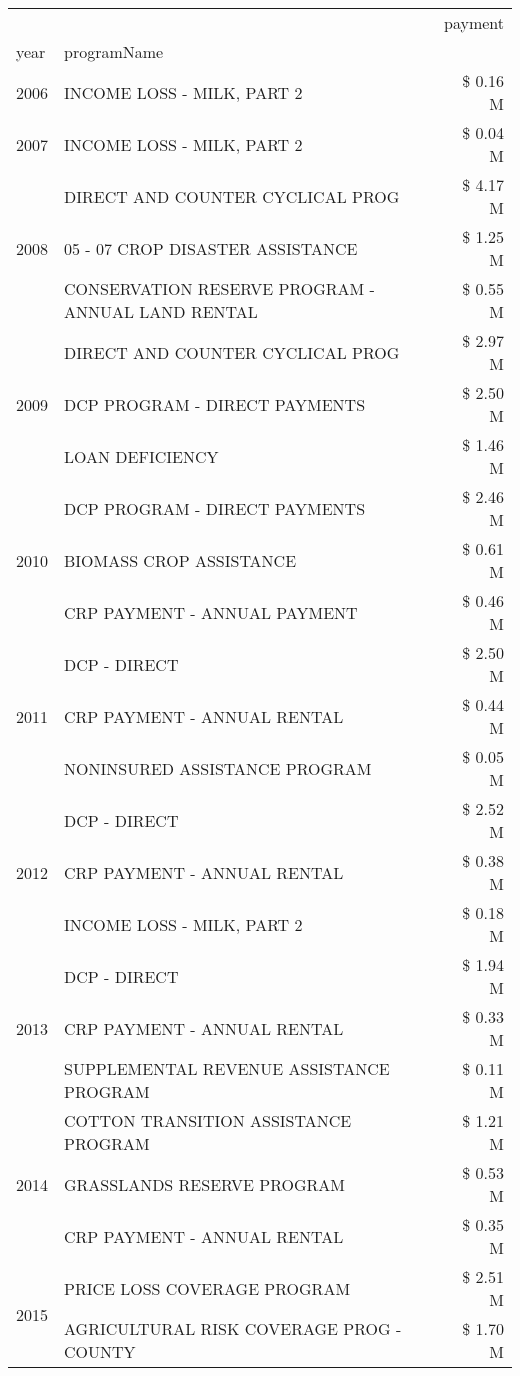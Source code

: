 \begin{tabular}{llr}
\toprule
 &  & payment \\
year & programName &  \\
\midrule
2006 & INCOME LOSS - MILK, PART 2 & \$ 0.16 M \\
\cline{1-3}
2007 & INCOME LOSS - MILK, PART 2 & \$ 0.04 M \\
\cline{1-3}
\multirow[t]{3}{*}{2008} & DIRECT AND COUNTER CYCLICAL PROG & \$ 4.17 M \\
 & 05 - 07 CROP DISASTER ASSISTANCE & \$ 1.25 M \\
 & CONSERVATION RESERVE PROGRAM - ANNUAL LAND RENTAL & \$ 0.55 M \\
\cline{1-3}
\multirow[t]{3}{*}{2009} & DIRECT AND COUNTER CYCLICAL PROG & \$ 2.97 M \\
 & DCP PROGRAM - DIRECT PAYMENTS & \$ 2.50 M \\
 & LOAN DEFICIENCY & \$ 1.46 M \\
\cline{1-3}
\multirow[t]{3}{*}{2010} & DCP PROGRAM - DIRECT PAYMENTS & \$ 2.46 M \\
 & BIOMASS CROP ASSISTANCE & \$ 0.61 M \\
 & CRP PAYMENT - ANNUAL PAYMENT & \$ 0.46 M \\
\cline{1-3}
\multirow[t]{3}{*}{2011} & DCP - DIRECT & \$ 2.50 M \\
 & CRP PAYMENT - ANNUAL RENTAL & \$ 0.44 M \\
 & NONINSURED ASSISTANCE PROGRAM & \$ 0.05 M \\
\cline{1-3}
\multirow[t]{3}{*}{2012} & DCP - DIRECT & \$ 2.52 M \\
 & CRP PAYMENT - ANNUAL RENTAL & \$ 0.38 M \\
 & INCOME LOSS - MILK, PART 2 & \$ 0.18 M \\
\cline{1-3}
\multirow[t]{3}{*}{2013} & DCP - DIRECT & \$ 1.94 M \\
 & CRP PAYMENT - ANNUAL RENTAL & \$ 0.33 M \\
 & SUPPLEMENTAL REVENUE ASSISTANCE PROGRAM & \$ 0.11 M \\
\cline{1-3}
\multirow[t]{3}{*}{2014} & COTTON TRANSITION ASSISTANCE PROGRAM & \$ 1.21 M \\
 & GRASSLANDS RESERVE PROGRAM & \$ 0.53 M \\
 & CRP PAYMENT - ANNUAL RENTAL & \$ 0.35 M \\
\cline{1-3}
\multirow[t]{3}{*}{2015} & PRICE LOSS COVERAGE PROGRAM & \$ 2.51 M \\
 & AGRICULTURAL RISK COVERAGE PROG - COUNTY & \$ 1.70 M \\

\end{tabular}
